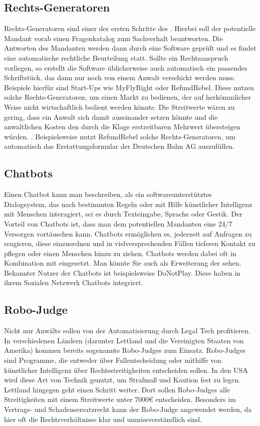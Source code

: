 \subsection{Rechts-Generatoren}
\label{Rechts-Generatoren}
Rechts-Generatoren sind einer der ersten Schritte des . Hierbei soll der potentielle Mandant vorab einen Fragenkatalog zum Sachverhalt beantworten. Die Antworten des Mandanten werden dann durch eine Software geprüft und es findet eine automatische rechtliche Beurteilung statt. Sollte ein Rechtsanspruch vorliegen, so erstellt die Software üblicherweise auch automatisch ein passendes Schriftstück, das dann nur noch von einem Anwalt verschickt werden muss. Beispiele hierfür sind Start-Ups wie MyFlyRight oder RefundRebel. Diese nutzen solche Rechts-Generatoren, um einen Markt zu bedienen, der auf herkömmlicher Weise nicht wirtschaftlich bedient werden könnte. Die Streitwerte wären zu gering, dass ein Anwalt sich damit auseinander setzen könnte und die anwaltlichen Kosten den durch die Klage erstreitbaren Mehrwert übersteigen würden. . Beispielsweise nutzt RefundRebel solche Rechts-Generatoren, um automatisch das Erstattungsformular der Deutschen Bahn AG auszufüllen.

\subsection{Chatbots}
Einen Chatbot kann man beschreiben, als ein softwareunterstütztes Dialogsystem, das nach bestimmten Regeln oder mit Hilfe künstlicher Intelligenz mit Menschen interagiert, sei es durch Texteingabe, Sprache oder Gestik. Der Vorteil von Chatbots ist, dass man dem potentiellen Mandanten eine 24/7 Versorgen vortäuschen kann. Chatbots ermöglichen es, jederzeit auf Anfragen zu reagieren, diese einzuordnen und in vielversprechenden Fällen tieferen Kontakt zu pflegen oder einen Menschen hinzu zu ziehen. Chatbots werden dabei oft in Kombination mit  eingesetzt. Man könnte Sie auch als Erweiterung der  sehen. Bekannter Nutzer der Chatbots ist beispielsweise DoNotPlay. Diese haben in ihrem Sozialen Netzwerk Chatbots integriert.
\subsection{Robo-Judge}
Nicht nur Anwälte sollen von der Automatisierung durch Legal Tech profitieren. In verschiedenen Ländern (darunter Lettland und die Vereinigten Staaten von Amerika) kommen bereits sogenannte Robo-Judges zum Einsatz. Robo-Judges sind Programme, die entweder über Fallentscheidung oder mithilfe von künstlicher Intelligenz über Rechtsstreitigkeiten entscheiden sollen. In den USA wird diese Art von Technik genutzt, um Strafmaß und Kaution fest zu legen. Lettland hingegen geht einen Schritt weiter. Dort sollen Robo-Judges alle Streitigkeiten mit einem Streitwerte unter 7000€ entscheiden.  Besonders im Vertrags- und Schadensersatzrecht kann der Robo-Judge angewendet werden, da hier oft die Rechtsverhältnisse klar und unmissverständlich sind.  